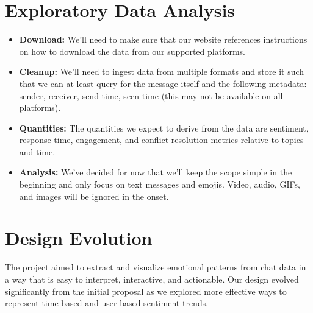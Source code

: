 \documentclass{article}\usepackage{graphicx}
\begin{document}
\section*{Exploratory Data Analysis}
\begin{itemize}
    \item \textbf{Download:} We'll need to make sure that our website references instructions on how to download the data from our supported platforms.
    \item \textbf{Cleanup:} We'll need to ingest data from multiple formats and store it such that we can at least query for the message itself and the following metadata: sender, receiver, send time, seen time (this may not be available on all platforms).
    \item \textbf{Quantities:} The quantities we expect to derive from the data are sentiment, response time, engagement, and conflict resolution metrics relative to topics and time.
    \item \textbf{Analysis:} We've decided for now that we'll keep the scope simple in the beginning and only focus on text messages and emojis. Video, audio, GIFs, and images will be ignored in the onset.
\end{itemize}

\section*{Design Evolution}
The project aimed to extract and visualize emotional patterns from chat data in a way that is easy to interpret, interactive, and actionable. Our design evolved significantly from the initial proposal as we explored more effective ways to represent time-based and user-based sentiment trends.
\end{document}
